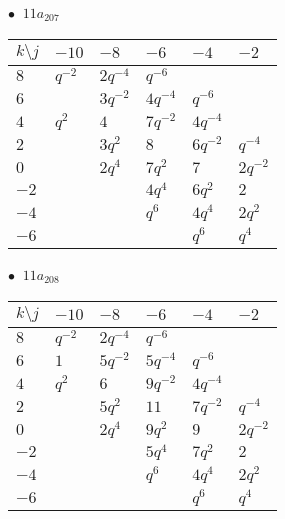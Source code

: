 \begin{minipage}{\linewidth}
$\bullet\ $ $11a_{207}$ \vspace{0.5em} \\
\begin{tabular}{l|lllll}
$k \setminus j$ & $-10$ & $-8$ & $-6$ & $-4$ & $-2$ \\
\hline
$8$ & $q^{-2}$ & $2q^{-4}$ & $q^{-6}$ &  &  \\
$6$ &  & $3q^{-2}$ & $4q^{-4}$ & $q^{-6}$ &  \\
$4$ & $q^{2}$ & $4$ & $7q^{-2}$ & $4q^{-4}$ &  \\
$2$ &  & $3q^{2}$ & $8$ & $6q^{-2}$ & $q^{-4}$ \\
$0$ &  & $2q^{4}$ & $7q^{2}$ & $7$ & $2q^{-2}$ \\
$-2$ &  &  & $4q^{4}$ & $6q^{2}$ & $2$ \\
$-4$ &  &  & $q^{6}$ & $4q^{4}$ & $2q^{2}$ \\
$-6$ &  &  &  & $q^{6}$ & $q^{4}$ \\
\end{tabular}
\vspace{2em}
\end{minipage}
%
\begin{minipage}{\linewidth}
$\bullet\ $ $11a_{208}$ \vspace{0.5em} \\
\begin{tabular}{l|lllll}
$k \setminus j$ & $-10$ & $-8$ & $-6$ & $-4$ & $-2$ \\
\hline
$8$ & $q^{-2}$ & $2q^{-4}$ & $q^{-6}$ &  &  \\
$6$ & $1$ & $5q^{-2}$ & $5q^{-4}$ & $q^{-6}$ &  \\
$4$ & $q^{2}$ & $6$ & $9q^{-2}$ & $4q^{-4}$ &  \\
$2$ &  & $5q^{2}$ & $11$ & $7q^{-2}$ & $q^{-4}$ \\
$0$ &  & $2q^{4}$ & $9q^{2}$ & $9$ & $2q^{-2}$ \\
$-2$ &  &  & $5q^{4}$ & $7q^{2}$ & $2$ \\
$-4$ &  &  & $q^{6}$ & $4q^{4}$ & $2q^{2}$ \\
$-6$ &  &  &  & $q^{6}$ & $q^{4}$ \\
\end{tabular}
\vspace{2em}
\end{minipage}
%
